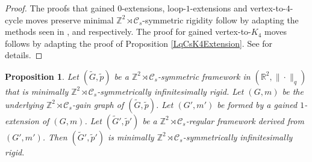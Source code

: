 \documentclass[reqno,a4paper,10pt]{article}
\newtheorem{proposition}[theorem]{Proposition}
\theoremstyle{definition}
\theoremstyle{remark}
\numberwithin{equation}{section}
\numberwithin{figure}{section}
\numberwithin{table}{section}
\newcommand{\R}{\mathbb{R}}
\newcommand{\Z}{\mathbb{Z}}
\newcommand{\G}{\tilde{G}}
\newcommand{\p}{\tilde{p}}
\begin{document}
    \begin{proof}
        The proofs that gained $0$-extensions, loop-$1$-extensions and vertex-to-$4$-cycle moves preserve minimal $\Z^2\rtimes\mathcal{C}_s$-symmetric rigidity follow by adapting the methods seen in \cite[Lemma 3.8]{NonEuclidean}, \cite[Lemma 6.1]{EGRES} and \cite[Lemma 3.12]{NonEuclidean} respectively. The proof for gained vertex-to-$K_4$ moves follows by adapting the proof of Proposition \ref{LqCsK4Extension}. See \cite{EssonThesis} for details.
    \end{proof}
    \begin{proposition}\label{LqZCs1Extension}
		Let $(\G,\p)$ be a $\Z^2\rtimes\mathcal{C}_s$-symmetric framework in $(\R^2,\|\cdot\|_q)$ that is minimally $\Z^2\rtimes\mathcal{C}_s$-symmetrically infinitesimally rigid. Let $(G,m)$ be the underlying $\Z^2\rtimes\mathcal{C}_s$-gain graph of $(\G,\p)$. Let $(G',m')$ be formed by a gained $1$-extension of $(G,m)$. Let $(\G',\p')$ be a $\Z^2\rtimes\mathcal{C}_s$-regular framework derived from $(G',m')$. Then $(\G',\p')$ is minimally $\Z^2\rtimes\mathcal{C}_s$-symmetrically infinitesimally rigid.
	\end{proposition}
\end{document}
